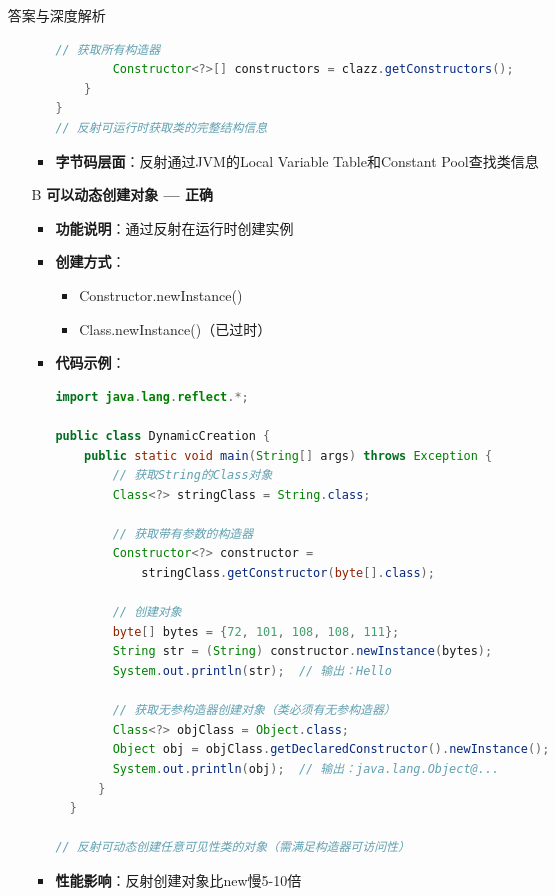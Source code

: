 \documentclass[12pt, a4paper]{ctexart}
\begin{document}
\begin{enumerate}[label=\textbf{\arabic*.}]
\begin{bluebox}{答案与深度解析}
\begin{itemize}[leftmargin=*, nosep, label={}]
\begin{itemize}[label={}, leftmargin=*, nosep]
\begin{lstlisting}[language=Java]
        // 获取所有构造器
        Constructor<?>[] constructors = clazz.getConstructors();
    }
}
// 反射可运行时获取类的完整结构信息
				      \end{lstlisting}
				            \item \textbf{字节码层面}：反射通过JVM的Local Variable Table和Constant Pool查找类信息
			            \end{itemize}

			      \item[B] \textbf{可以动态创建对象 — 正确}
			            \begin{itemize}[label={}, leftmargin=*, nosep]
				            \item \textbf{功能说明}：通过反射在运行时创建实例
				            \item \textbf{创建方式}：
				                  \begin{itemize}[label={}, nosep]
					                  \item Constructor.newInstance()
					                  \item Class.newInstance()（已过时）
				                  \end{itemize}
				            \item \textbf{代码示例}：
				                  \begin{lstlisting}[language=Java]
import java.lang.reflect.*;

public class DynamicCreation {
    public static void main(String[] args) throws Exception {
        // 获取String的Class对象
        Class<?> stringClass = String.class;

        // 获取带有参数的构造器
        Constructor<?> constructor =
            stringClass.getConstructor(byte[].class);

        // 创建对象
        byte[] bytes = {72, 101, 108, 108, 111};
        String str = (String) constructor.newInstance(bytes);
        System.out.println(str);  // 输出：Hello

        // 获取无参构造器创建对象（类必须有无参构造器）
        Class<?> objClass = Object.class;
        Object obj = objClass.getDeclaredConstructor().newInstance();
        System.out.println(obj);  // 输出：java.lang.Object@...
      }
  }

// 反射可动态创建任意可见性类的对象（需满足构造器可访问性）
				      \end{lstlisting}
				            \item \textbf{性能影响}：反射创建对象比new慢5-10倍
			            \end{itemize}


\end{itemize}
\end{bluebox}
\end{enumerate}
\end{document}
